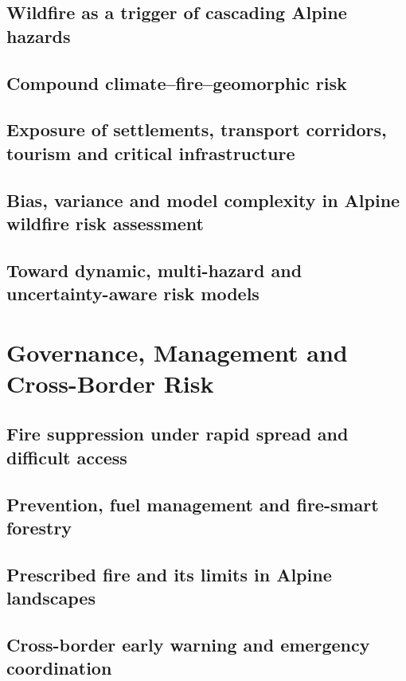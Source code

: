 \documentclass[11pt,a4paper]{article}
\begin{document}
\subsection{Wildfire as a trigger of cascading Alpine hazards}

\subsection{Compound climate--fire--geomorphic risk}

\subsection{Exposure of settlements, transport corridors, tourism and critical infrastructure}

\subsection{Bias, variance and model complexity in Alpine wildfire risk assessment}

\subsection{Toward dynamic, multi-hazard and uncertainty-aware risk models}


\section{Governance, Management and Cross-Border Risk}

\subsection{Fire suppression under rapid spread and difficult access}

\subsection{Prevention, fuel management and fire-smart forestry}

\subsection{Prescribed fire and its limits in Alpine landscapes}

\subsection{Cross-border early warning and emergency coordination}
\end{document}

